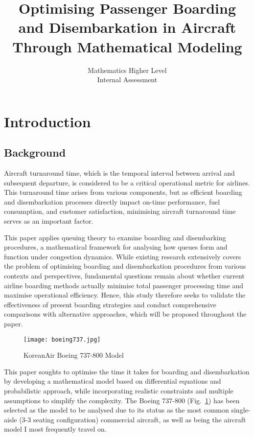 \documentclass[12pt,a4paper]{article}
\title{Optimising Passenger Boarding and Disembarkation in Aircraft Through Mathematical Modeling}
\author{Mathematics Higher Level \\
Internal Assessment}
\date{}
\begin{document}
\maketitle

\tableofcontents
\newpage

\section{Introduction}
\subsection{Background}

Aircraft turnaround time, which is the temporal interval between arrival and subsequent departure, is considered to be a critical operational metric for airlines. This turnaround time arises from various components, but as efficient boarding and disembarkation processes directly impact on-time performance, fuel consumption, and customer satisfaction, minimising aircraft turnaround time serves as an important factor.

This paper applies queuing theory to examine boarding and disembarking procedures, a mathematical framework for analysing how queues form and function under congestion dynamics. While existing research extensively covers the problem of optimising boarding and disembarkation procedures from various contexts and perspectives, fundamental questions remain about whether current airline boarding methods actually minimise total passenger processing time and maximise operational efficiency. Hence, this study therefore seeks to validate the effectiveness of present boarding strategies and conduct comprehensive comparisons with alternative approaches, which will be proposed throughout the paper.

\begin{figure}[H]
\centering
\texttt{[image: boeing737.jpg]}
\caption{KoreanAir Boeing 737-800 Model}
\label{fig:boeing737}
\end{figure}

This paper soughts to optimise the time it takes for boarding and disembarkation by developing a mathematical model based on differential equations and probabilistic approach, while incorporating realistic constraints and multiple assumptions to simplify the complexity. The Boeing 737-800 (Fig.~\ref{fig:boeing737}) has been selected as the model to be analysed due to its status as the most common single-aisle (3-3 seating configuration) commercial aircraft, as well as being the aircraft model I most frequently travel on.
\end{document}
